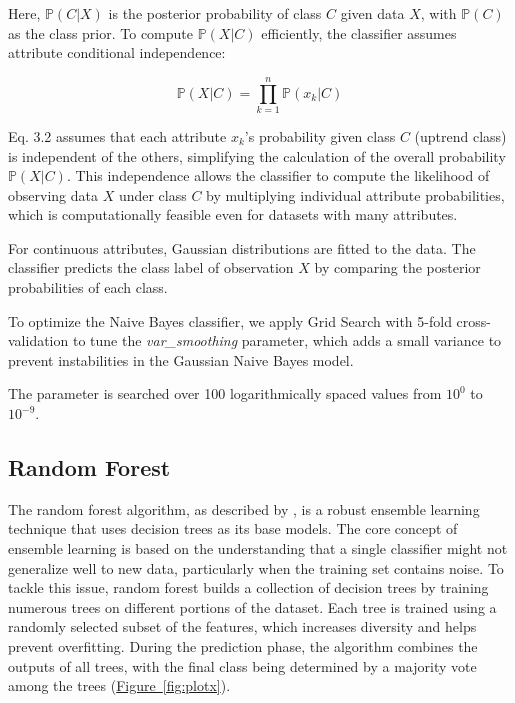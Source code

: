 \documentclass[aodsor,preprint]{imsart}
\numberwithin{equation}{section}
\theoremstyle{plain}
\begin{document}
Here, $\mathbb{P}(C|X)$ is the posterior probability of class $C$ given data $X$, with $\mathbb{P}(C)$ as the class prior. To compute $\mathbb{P}(X|C)$ efficiently, the classifier assumes attribute conditional independence:

\begin{equation}
\mathbb{P}(X|C) = \prod_{k=1}^{n} \mathbb{P}(x_k|C)
\end{equation}

Eq. 3.2 assumes that each attribute \( x_k \)'s probability given class \( C \) (uptrend class) is independent of the others, simplifying the calculation of the overall probability \( \mathbb{P}(X|C) \). This independence allows the classifier to compute the likelihood of observing data \( X \) under class \( C \) by multiplying individual attribute probabilities, which is computationally feasible even for datasets with many attributes.

For continuous attributes, Gaussian distributions are fitted to the data. The classifier predicts the class label of observation $X$ by comparing the posterior probabilities of each class.

To optimize the Naive Bayes classifier, we apply Grid Search with 5-fold cross-validation to tune the \textit{var\_smoothing} parameter, which adds a small variance to prevent instabilities in the Gaussian Naive Bayes model.

The parameter is searched over 100 logarithmically spaced values from $10^0$ to $10^{-9}$.

\subsection{Random Forest}
\label{sec:Sub}

The random forest algorithm, as described by \cite{Hastie2009}, is a robust ensemble learning technique that uses decision trees as its base models. The core concept of ensemble learning is based on the understanding that a single classifier might not generalize well to new data, particularly when the training set contains noise. To tackle this issue, random forest builds a collection of decision trees by training numerous trees on different portions of the dataset. Each tree is trained using a randomly selected subset of the features, which increases diversity and helps prevent overfitting. During the prediction phase, the algorithm combines the outputs of all trees, with the final class being determined by a majority vote among the trees (\hyperref[fig:plotx]{Figure~\ref*{fig:plotx}}).
\end{document}
